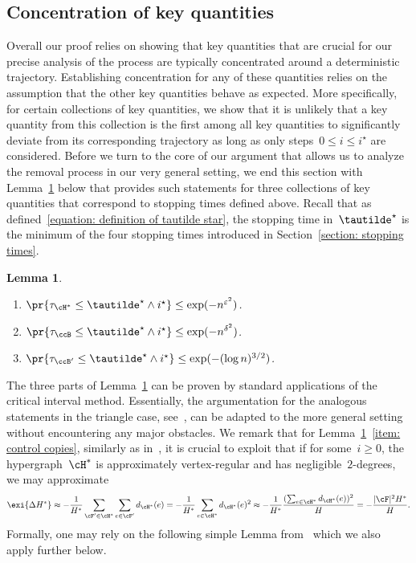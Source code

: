 \documentclass[11pt]{amsart}
\newcommand{\eps}{\varepsilon}
\DeclarePairedDelimiter{\paren}{\lparen}{\rparen}
\DeclarePairedDelimiter{\abs}{\lvert}{\rvert}
\newtheorem{lemma}[algocf]{Lemma}
\theoremstyle{definition}
\numberwithin{equation}{section}
\begin{document}
	\subsection{Concentration of key quantities}\label{subsection: auxiliary control}
	Overall our proof relies on showing that key quantities that are crucial for our precise analysis of the process are typically concentrated around a deterministic trajectory.
	Establishing concentration for any of these quantities relies on the assumption that the other key quantities behave as expected.
	More specifically, for certain collections of key quantities, we show that it is unlikely that a key quantity from this collection is the first among all key quantities to significantly deviate from its corresponding trajectory as long as only steps~$0\leq i\leq i^\star$ are considered.
	Before we turn to the core of our argument that allows us to analyze the removal process in our very general setting, we end this section with Lemma~\ref{lemma: auxiliary control} below that provides such statements for three collections of key quantities that correspond to stopping times defined above.
	Recall that as defined~\eqref{equation: definition of tautilde star}, the stopping time in~$\tautilde^\star$ is the minimum of the four stopping times introduced in Section~\ref{section: stopping times}.
	
	\begin{lemma}\label{lemma: auxiliary control}
		\begin{enumerate}[label=\textup{(\roman*)}]
			\item\label{item: control copies} $\pr{\tau_{\cH^*}\leq\tautilde^\star\wedge i^\star}\leq \exp(-n^{\eps^2})$.
			\item\label{item: control balanced} $\pr{\tau_{\ccB}\leq \tautilde^\star \wedge i^\star}\leq \exp(-n^{\delta^2})$.
			\item\label{item: control strictly balanced} $\pr{\tau_{\ccB'}\leq\tautilde^\star \wedge i^\star}\leq \exp(-(\log n)^{3/2})$.
		\end{enumerate}
	\end{lemma}
	
	The three parts of Lemma~\ref{lemma: auxiliary control} can be proven by standard applications of the critical interval method.
	Essentially, the argumentation for the analogous statements in the triangle case, see~\cite[Sections~2 and~3]{BFL:15}, can be adapted to the more general setting without encountering any major obstacles.
	We remark that for Lemma~\ref{lemma: auxiliary control}~\ref{item: control copies}, similarly as in~\cite{BFL:15}, it is crucial to exploit that if for some~$i\geq 0$, the hypergraph~$\cH^*$ is approximately vertex-regular and has negligible~$2$-degrees, we may approximate
	\begin{equation*}
		\exi{\Delta H^*}
		\approx -\frac{1}{H^*}\sum_{\cF'\in\cH^*}\sum_{e\in\cF'}d_{\cH^*}(e)
		=-\frac{1}{H^*}\sum_{e\in\cH^*} d_{\cH^*}(e)^2
		\approx -\frac{1}{H^*}\frac{\paren{\sum_{e\in\cH^*} d_{\cH^*}(e)}^2}{H}
		=-\frac{\abs{\cF}^2 H^*}{H}.
	\end{equation*}
	Formally, one may rely on the following simple Lemma from~\cite{BB:19} which we also apply further below.
	
\end{document}
